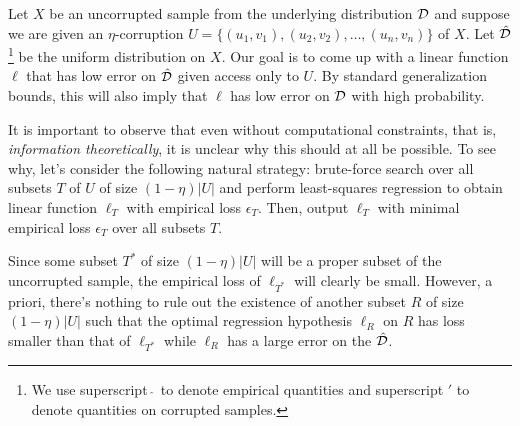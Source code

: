 Let $X$ be an uncorrupted sample from the underlying distribution $\mathcal D$ and suppose we are given an $\eta$-corruption $U = \{(u_1,v_1), (u_2,v_2), \ldots, (u_n,v_n)\}$ of $X$. Let $\hat{\mathcal D}$\footnote{We use superscript $\hat{\;}$ to denote empirical quantities and superscript $'$ to denote quantities on corrupted samples.} be the uniform distribution on $X$. Our goal is to come up with a linear function $\ell$ that has low error on $\hat{\mathcal D}$ given access only to $U$. By standard generalization bounds, this will also imply that $\ell$ has low error on $\mathcal D$ with high probability. 

It is important to observe that even without computational constraints, that is, \emph{information theoretically}, it is unclear why this should at all be possible. To see why, 
let's consider the following natural strategy: brute-force search over all subsets $T$ of $U$ of size
$(1 - \eta) |U|$ and perform least-squares regression to obtain linear
function $\ell_T$ with empirical loss $\epsilon_T$.  Then,
output $\ell_T$ with minimal empirical loss $\epsilon_T$ over all
subsets $T$.  

Since some subset $T^{*}$ of size $(1-\eta)|U|$ will be a proper subset of the uncorrupted sample, the empirical loss of $\ell_{T^{*}}$ will clearly be small. However, a priori, there's nothing to rule out the existence of another subset $R$ of size $(1-\eta)|U|$ such that the optimal regression hypothesis $\ell_R$ on $R$ has loss smaller than that of $\ell_{T^{*}}$ while $\ell_R$ has a large error on the $\hat{\mathcal D}$. %
%

